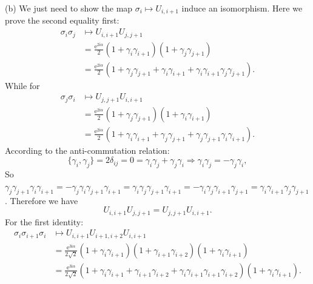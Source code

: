 \documentclass{book}
\begin{document}
(b) We just need to show the map $\sigma _{i} \mapsto U_{i,i+1}$ induce an isomorphism. Here we prove the second equality first:
\begin{equation*}
\begin{aligned}
\sigma _{i} \sigma _{j} & \mapsto U_{i,i+1} U_{j,j+1}\\
 & =\frac{\mathrm{e}^{2\mathrm{i} \alpha }}{2}( 1+\gamma _{i} \gamma _{i+1})( 1+\gamma _{j} \gamma _{j+1})\\
 & =\frac{\mathrm{e}^{2\mathrm{i} \alpha }}{2}( 1+\gamma _{j} \gamma _{j+1} +\gamma _{i} \gamma _{i+1} +\gamma _{i} \gamma _{i+1} \gamma _{j} \gamma _{j+1}) .
\end{aligned}
\end{equation*}
While for
\begin{equation*}
\begin{aligned}
\sigma _{j} \sigma _{i} & \mapsto U_{j,j+1} U_{i,i+1}\\
 & =\frac{\mathrm{e}^{2\mathrm{i} \alpha }}{2}( 1+\gamma _{j} \gamma _{j+1})( 1+\gamma _{i} \gamma _{i+1})\\
 & =\frac{\mathrm{e}^{2\mathrm{i} \alpha }}{2}( 1+\gamma _{i} \gamma _{i+1} +\gamma _{j} \gamma _{j+1} +\gamma _{j} \gamma _{j+1} \gamma _{i} \gamma _{i+1}) .
\end{aligned}
\end{equation*}
According to the anti-commutation relation:
\begin{equation*}
\{\gamma _{i} ,\gamma _{j}\} =2\delta _{ij} =0=\gamma _{i} \gamma _{j} +\gamma _{j} \gamma _{i} \Rightarrow \gamma _{i} \gamma _{j} =-\gamma _{j} \gamma _{i} ,
\end{equation*}
So $\gamma _{j} \gamma _{j+1} \gamma _{i} \gamma _{i+1} =-\gamma _{j} \gamma _{i} \gamma _{j+1} \gamma _{i+1} =\gamma _{i} \gamma _{j} \gamma _{j+1} \gamma _{i+1} =-\gamma _{i} \gamma _{j} \gamma _{i+1} \gamma _{j+1} =\gamma _{i} \gamma _{i+1} \gamma _{j} \gamma _{j+1}$. Therefore we have
\begin{equation*}
U_{i,i+1} U_{j,j+1} =U_{j,j+1} U_{i,i+1} .
\end{equation*}
For the first identity:
\begin{equation*}
\begin{aligned}
\sigma _{i} \sigma _{i+1} \sigma _{i} & \mapsto U_{i,i+1} U_{i+1,i+2} U_{i,i+1}\\
 & =\frac{\mathrm{e}^{3\mathrm{i} \alpha }}{2\sqrt{2}}( 1+\gamma _{i} \gamma _{i+1})( 1+\gamma _{i+1} \gamma _{i+2})( 1+\gamma _{i} \gamma _{i+1})\\
 & =\frac{\mathrm{e}^{3\mathrm{i} \alpha }}{2\sqrt{2}}( 1+\gamma _{i} \gamma _{i+1} +\gamma _{i+1} \gamma _{i+2} +\gamma _{i} \gamma _{i+1} \gamma _{i+1} \gamma _{i+2})( 1+\gamma _{i} \gamma _{i+1}) .
\end{aligned}
\end{equation*}
\end{document}
